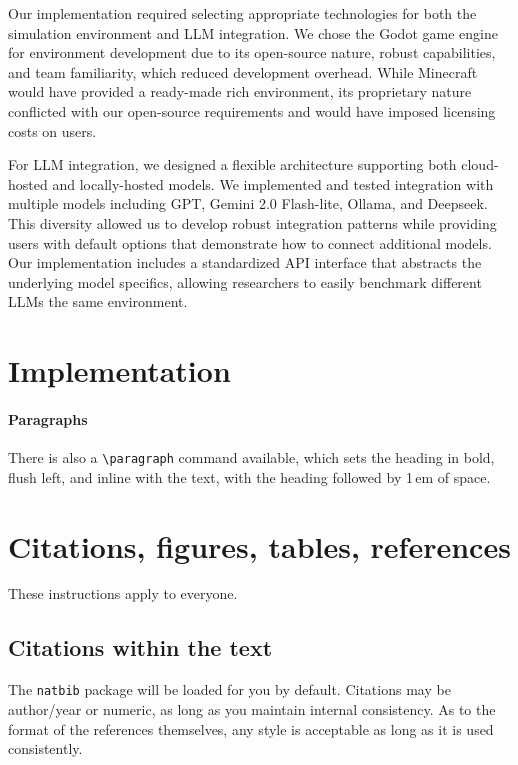 \documentclass{article}
\begin{document}
Our implementation required selecting appropriate technologies for both the simulation environment and LLM integration.
We chose the Godot game engine for environment development due to its open-source nature, robust capabilities, and team familiarity, which reduced development overhead.
While Minecraft would have provided a ready-made rich environment, its proprietary nature conflicted with our open-source requirements and would have imposed licensing costs on users.

For LLM integration, we designed a flexible architecture supporting both cloud-hosted and locally-hosted models.
We implemented and tested integration with multiple models including GPT, Gemini 2.0 Flash-lite, Ollama, and Deepseek.
This diversity allowed us to develop robust integration patterns while providing users with default options that demonstrate how to connect additional models.
Our implementation includes a standardized API interface that abstracts the underlying model specifics, allowing researchers to easily benchmark different LLMs the same environment.


\section{Implementation}

\paragraph{Paragraphs}


There is also a \verb+\paragraph+ command available, which sets the heading in
bold, flush left, and inline with the text, with the heading followed by 1\,em
of space.


\section{Citations, figures, tables, references}
\label{others}


These instructions apply to everyone.


\subsection{Citations within the text}


The \verb+natbib+ package will be loaded for you by default.  Citations may be
author/year or numeric, as long as you maintain internal consistency.  As to the
format of the references themselves, any style is acceptable as long as it is
used consistently.
\end{document}
